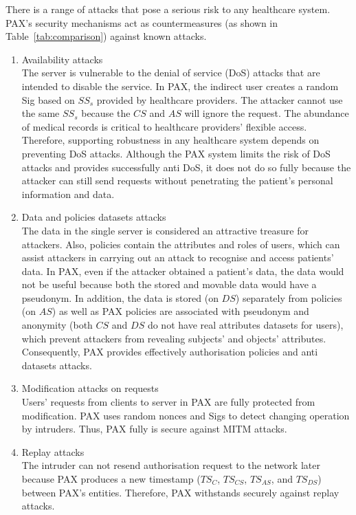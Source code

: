 \documentclass[journal,article,submit,moreauthors,pdftex]{Definitions/mdpi}
\begin{document}
There is a range of attacks that pose a serious risk to any healthcare system. PAX's security mechanisms act as countermeasures (as shown in Table~\ref{tab:comparison}) against known attacks.
\begin{enumerate}
\item Availability attacks\\
The server is vulnerable to the denial of service (DoS) attacks that are intended to disable the service. In PAX, the indirect user creates a random Sig based on $SS_s$ provided by healthcare providers. The attacker cannot use the same $SS_s$ because the $CS$ and $AS$ will ignore the request. The abundance of medical records is critical to healthcare providers' flexible access.  Therefore, supporting robustness in any healthcare system depends on preventing DoS attacks. Although the PAX system limits the risk of DoS attacks and provides successfully anti DoS, it does not do so fully because the attacker can still send requests without penetrating the patient's personal information and data.
  \item Data and policies datasets attacks\\
The data in the single server is considered an attractive treasure for attackers. Also, policies contain the attributes and roles of users, which can assist attackers in carrying out an attack to recognise and access patients' data. In PAX, even if the attacker obtained a patient's data, the data would not be useful because both the stored and movable data would have a pseudonym. In addition, the data is stored (on $ DS $) separately from policies (on $ AS $) as well as PAX policies are associated with pseudonym and anonymity (both $CS$ and $DS$ do not have real attributes datasets for users), which prevent attackers from revealing subjects' and objects' attributes. Consequently, PAX provides effectively authorisation policies and anti datasets attacks.
  \item Modification attacks on requests\\
Users' requests from clients to server in PAX are fully protected from modification. PAX uses random nonces and Sigs to detect changing operation by intruders. Thus, PAX fully is secure against MITM attacks.
 \item Replay attacks\\
The intruder can not resend authorisation request to the network later because PAX produces a new timestamp ($TS_{C}$, $TS_{CS}$, $TS_{AS}$, and $TS_{DS}$) between PAX’s entities. Therefore, PAX withstands securely against replay attacks.

\end{enumerate}
\end{document}
